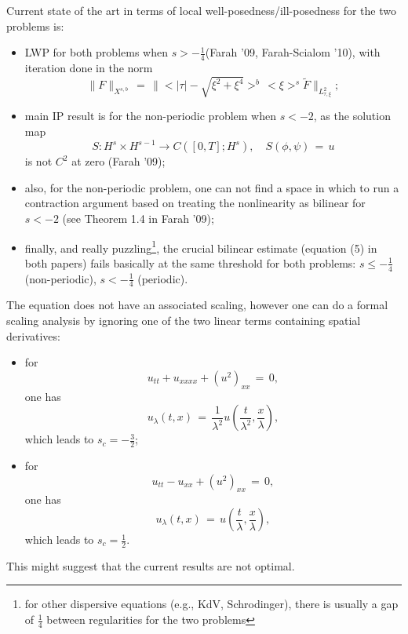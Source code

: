 \documentclass[12pt,reqno]{amsart}
\numberwithin{equation}{section}  %
\numberwithin{figure}{section}
\begin{document}
Current state of the art in terms of local well-posedness/ill-posedness for the two problems is:
\begin{itemize}
  \item LWP for both problems when $s>-\frac 14$(Farah '09, Farah-Scialom '10), with iteration done in
    the norm
    \[
    \|F\|_{X^{s,b}}\,=\,\|<|\tau|-\sqrt{\xi^2+\xi^4}>^b\,<\xi>^s \tilde{F}\|_{L^2_{\tau,\xi}};
    \]

  \item main IP result is for the non-periodic problem when $s<-2$, as the solution map 
    \[
    S: H^s\times H^{s-1} \to C([0,T]; H^s), \quad
    S(\phi,\psi)\,=\,u
    \]
    is not $C^2$ at zero (Farah '09);

  \item also, for the non-periodic problem, one can not find a space in which to run a contraction argument based on treating the nonlinearity as bilinear for $s<-2$ (see Theorem 1.4 in Farah '09);

  \item finally, and really puzzling\footnote{for other dispersive equations (e.g., KdV, Schrodinger), there is usually a gap of $\frac 14$ between regularities for the two problems}, the crucial bilinear estimate (equation (5) in both papers) fails basically at the same threshold for both problems: $s\leq -\frac 14$ (non-periodic), $s<-\frac{1}{4}$ (periodic).
\end{itemize}

The equation does not have an associated scaling, however one can do a formal scaling analysis by ignoring one of the two linear terms containing spatial derivatives:
\begin{itemize}
  \item for 
    \[
    u_{tt}+u_{xxxx}+(u^2)_{xx}\,=\,0,
    \]
    one has 
    \[
    u_{\lambda}(t,x)\,=\,\frac{1}{\lambda^2}u\left(\frac{t}{\lambda^2}, \frac{x}{\lambda}\right),
    \]
    which leads to $s_c=-\frac 32$;

  \item for 
    \[
    u_{tt}-u_{xx}+(u^2)_{xx}\,=\,0,
    \]
    one has 
    \[
    u_{\lambda}(t,x)\,=\,u\left(\frac{t}{\lambda}, \frac{x}{\lambda}\right),
    \]
    which leads to $s_c=\frac 12$.
\end{itemize}

This might suggest that the current results are not optimal.


%

%
%
%
%
%
\end{document}
